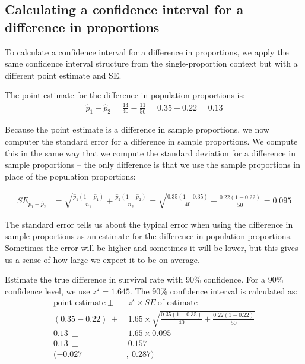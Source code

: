 \D{\newpage}

\subsection{Calculating a confidence interval for a difference in proportions}
To calculate a confidence interval for a difference in proportions, we apply the same confidence interval structure from the single-proportion context but with a different point estimate and SE.

The point estimate for the difference in population proportions is:
  \begin{align*}
  \hat{p}_{1} - \hat{p}_{2}
    = \frac{14}{40} - \frac{11}{50}
    = 0.35 - 0.22
    = 0.13
  \end{align*}


Because the point estimate is a difference in sample proportions, we now computer the standard error for a difference in sample proportions.  We compute this in the same way that we compute the standard deviation for a difference in sample proportions --  the only difference is that we use the sample proportions in place of the population proportions:

\begin{align*}
SE_{\hat{p}_1-\hat{p}_2} &= \sqrt{\frac{\hat{p}_1(1-\hat{p}_1)}{n_1} + \frac{\hat{p}_2(1-\hat{p}_2)}{n_2}}= \sqrt{\frac{0.35 (1 - 0.35)}{40} +
      \frac{0.22 (1 - 0.22)}{50}}
    = 0.095
  \end{align*}

The standard error tells us about the typical error when using the difference in sample proportions as an estimate for the  difference in population proportions.  Sometimes the error will be higher and sometimes it will be lower, but this gives us a sense of how large we expect it to be on average.   

\begin{examplewrap}
\begin{nexample}{Estimate the true difference in survival rate with 90\% confidence.}
For a 90\% confidence level, we use $z^{\star} = 1.645$.  The 90\% confidence interval is calculated as:
  \begin{align*}
  \text{point estimate} \ \pm&\ z^{\star} \times SE\ \text{of estimate}\\
(0.35 - 0.22) \ \pm&\ 1.65 \times \sqrt{\frac{0.35 (1 - 0.35)}{40} +
      \frac{0.22 (1 - 0.22)}{50}}\\
     0.13 \ \pm&\ 1.65\times 0.095\\
  0.13 \ \pm&\ 0.157\\
 (-0.027&,\  0.287)
  \end{align*}
\end{nexample}
\end{examplewrap}


